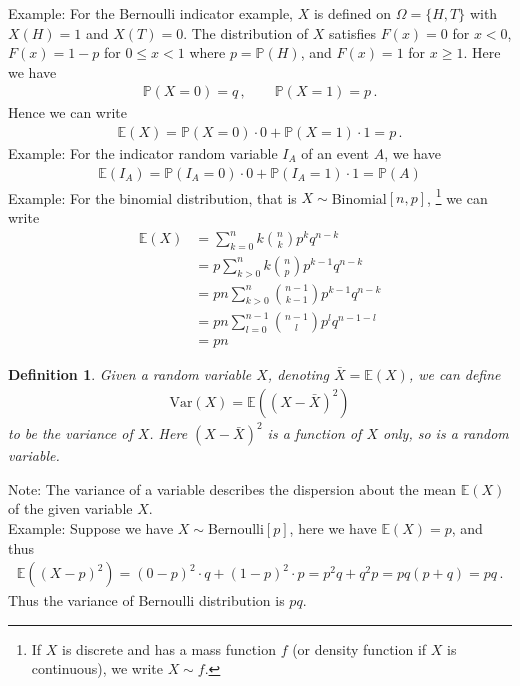 \documentclass[11pt, onesided]{book}
\theoremstyle{break}
\theoremstyle{break}
\newtheorem{defn}{Definition}[thm]
\newcommand{\note}{\color{red}Note: \color{black}}
\newcommand{\example}{\color{green}Example: \color{black}}
\begin{document}
\example For the Bernoulli indicator example, $X$ is defined on $\Omega = \{H,T\}$ with $X(H) = 1$ and $X(T) = 0$. The distribution of $X$ satisfies $F(x) = 0$ for $x<0$, $F(x) = 1-p$ for $0\leq x< 1$ where $p = \mathbb{P}(H)$, and $F(x) = 1$ for $x\geq 1$. Here we have 
\begin{align*}
\mathbb{P}(X = 0) = q\,, \qquad \mathbb{P}(X = 1) = p\,.
\end{align*}
Hence we can write
\begin{align*}
\mathbb{E}(X) = \mathbb{P}(X = 0) \cdot 0 + \mathbb{P}(X = 1) \cdot 1 = p\,.
\end{align*}
\example For the indicator random variable $I_A$ of an event $A$, we have 
\begin{align*}
\mathbb{E}(I_A) = \mathbb{P}(I_A=0)\cdot 0 + \mathbb{P}(I_A = 1) \cdot 1 = \mathbb{P}(A)
\end{align*}
\example For the binomial distribution, that is $X \sim $Binomial$[n,p]$, \footnote{If $X$ is discrete and has a mass function $f$ (or density function if $X$ is continuous), we write $X \sim f$.} we can write
\begin{align*}
\mathbb{E}(X) 
&= \sum_{k=0}^n k\binom{n}{k} p^k q^{n-k} \\
&=p \sum_{k>0}^n k \binom{n}{p} p^{k-1} q^{n-k}\\ 
&= pn \sum_{k>0}^n \binom{n-1}{k-1} p^{k-1} q^{n-k}\\
&= pn \sum_{l=0}^{n-1} \binom{n-1}{l} p^l q^{n-1-l} \\
&= pn
\end{align*}

\begin{defn}
Given a random variable $X$, denoting $\bar{X} = \mathbb{E}(X)$, we can define 
\begin{align*}
\text{Var}(X) = \mathbb{E}((X - \bar{X})^2)
\end{align*} to be the variance of $X$. Here $(X - \bar{X})^2$ is a function of $X$ only, so is a random variable. 
\end{defn}
\note The variance of a variable describes the dispersion about the mean $\mathbb{E}(X)$ of the given variable $X$. \\


\example Suppose we have $X \sim $Bernoulli$[p]$, here we have $\mathbb{E}(X) = p$, and thus 
\begin{align*}
\mathbb{E}((X-p)^2) = (0-p)^2 \cdot q + (1-p)^2 \cdot p = p^2 q+q^2 p = pq(p+q) = pq\,.
\end{align*}
Thus the variance of Bernoulli distribution is $pq$.\\
\end{document}
